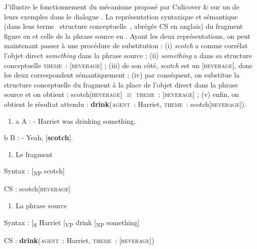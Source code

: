 J'illustre le fonctionnement du mécanisme proposé par Culicover \& \citet{Jackendoff2005} sur un de leurs exemples dans le dialogue . La représentation syntaxique et sémantique (dans leus terms {\guillemotleft}~structure conceptuelle~{\guillemotright}, abrégée CS en anglais) du fragment figure en  et celle de la phrase source en . Ayant les deux représentations, on peut maintenant passer à une procédure de substitution : (i) \textit{scotch} a comme corrélat l'objet direct \textit{something} dans la phrase source ; (ii) \textit{something} a dans sa structure conceptuelle \textsc{theme}\textit{~}: [\textsc{beverage}] ; (iii) de son côté, \textit{scotch} est un [\textsc{beverage}], donc les deux correspondent sémantiquement ; (iv) par conséquent, on substitue la structure conceptuelle du fragment à la place de l'objet direct dans la phrase source et on obtient : scotch[\textsc{beverage}] ${\equiv}$ \textsc{theme}\textit{~}: [\textsc{beverage}] ; (v) enfin, on obtient le résultat attendu : \textbf{drink}(\textsc{agent}\textit{~}: Harriet, \textsc{theme}\textit{~}: scotch[\textsc{beverage}]).


\begin{enumerate}
\item \label{bkm:Ref306135804}a  A : - Harriet was drinking something. 


\end{enumerate}
  b  B : - Yeah, [\textbf{scotch}]. 


\begin{enumerate}
\item \label{bkm:Ref306135893}Le fragment            


\end{enumerate}
  Syntax :    [\textsubscript{NP} scotch] 

  CS :      scotch[\textsc{beverage}]


\begin{enumerate}
\item \label{bkm:Ref306135895}La phrase source            


\end{enumerate}
  Syntax :    [\textsubscript{S} Harriet [\textsubscript{VP} drink [\textsubscript{NP} something] 

  CS :      \textbf{drink}(\textsc{agent}\textit{~}: Harriet, \textsc{theme}\textit{~}: [\textsc{beverage}])

